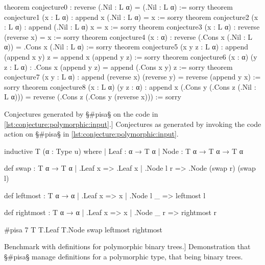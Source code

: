 \begin{listing}[H]
\begin{LeanCode}
theorem conjecture0
  : reverse (.Nil : L α) = (.Nil : L α) := sorry
theorem conjecture1 (x : L α) : append x (.Nil : L α) = x := sorry
theorem conjecture2 (x : L α) : append (.Nil : L α) x = x := sorry
theorem conjecture3 (x : L α) : reverse (reverse x) = x := sorry
theorem conjecture4 (x : α)
  : reverse (.Cons x (.Nil : L α)) = .Cons x (.Nil : L α) := sorry
theorem conjecture5 (x y z : L α)
  : append (append x y) z = append x (append y z) := sorry
theorem conjecture6 (x  : α) (y z : L α)
  : .Cons x (append y z) = append (.Cons x y) z := sorry
theorem conjecture7 (x y : L α)
  : append (reverse x) (reverse y) = reverse (append y x) := sorry
theorem conjecture8 (x : L α) (y z : α)
  : append x (.Cons y (.Cons z (.Nil : L α)))
  = reverse (.Cons z (.Cons y (reverse x))) := sorry
\end{LeanCode}
\caption
  [Conjectures generated by §\#pisa§ on the code in \cref{lst:conjecture:polymorphic:input}.]
  {Conjectures as generated by invoking the code action on §\#pisa§ in \cref{lst:conjecture:polymorphic:input}.}
\label{lst:conjecture:polymorphic:output}
\end{listing}


\begin{listing}[H]
\begin{LeanCode}
inductive T (α : Type u) where
  | Leaf : α → T α
  | Node : T α → T α → T α

def swap : T α → T α
  | .Leaf x => .Leaf x
  | .Node l r => .Node (swap r) (swap l)

def leftmost : T α → α
  | .Leaf x => x
  | .Node l _ => leftmost l

def rightmost : T α → α
  | .Leaf x => x
  | .Node _ r => rightmost r

#pisa 7 T T.Leaf T.Node swap leftmost rightmost
\end{LeanCode}
\caption
  [Benchmark with definitions for polymorphic binary trees.]
  {Demonstration that §\#pisa§ manage definitions for a polymorphic type, that being binary trees.}
\label{lst:conjecture:polymorphic2:input}
\end{listing}

